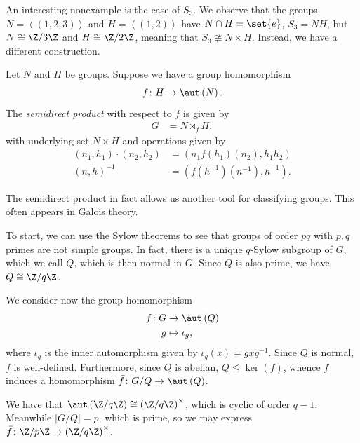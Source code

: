\documentclass[10pt]{mypackage}
\begin{document}
An interesting nonexample is the case of $S_3$. We observe that the groups $N = \left\langle \left( 1,2,3 \right) \right\rangle$ and $H = \left\langle \left( 1,2 \right) \right\rangle$ have $N\cap H = \set{e}$, $S_3 = NH$, but $N\cong \Z/3\Z$ and $H\cong \Z/2\Z$, meaning that $S_3\ncong N\times H$. Instead, we have a different construction.
\begin{definition}
  Let $N$ and $H$ be groups. Suppose we have a group homomorphism
  \begin{align*}
    f\colon H\rightarrow \aut\left( N \right).
  \end{align*}
  The \textit{semidirect product} with respect to $f$ is given by
  \begin{align*}
    G &= N\rtimes_{f} H,
  \end{align*}
  with underlying set $N\times H$ and operations given by
  \begin{align*}
    \left( n_1,h_1 \right)\cdot \left( n_2,h_2 \right) &= \left( n_1f\left( h_1 \right)\left( n_2 \right),h_1h_2 \right)\\
    \left( n,h \right)^{-1} &= \left( f\left( h^{-1} \right)\left( n^{-1} \right),h^{-1} \right).
  \end{align*}
\end{definition}
The semidirect product in fact allows us another tool for classifying groups. This often appears in Galois theory.%

To start, we can use the Sylow theorems to see that groups of order $pq$ with $p,q$ primes are not simple groups. In fact, there is a unique $q$-Sylow subgroup of $G$, which we call $Q$, which is then normal in $G$. Since $Q$ is also prime, we have $Q\cong \Z/q\Z$.%

We consider now the group homomorphism
\begin{align*}
  f\colon G &\rightarrow \aut\left( Q \right)\\
  g&\mapsto \iota_g,
\end{align*}
where $\iota_g$ is the inner automorphism given by $\iota_g(x) = gxg^{-1}$. Since $Q$ is normal, $f$ is well-defined. Furthermore, since $Q$ is abelian, $Q\leq \ker\left( f \right)$, whence $f$ induces a homomorphism $ \bar{f}\colon G/Q\rightarrow \aut\left( Q \right) $.%

We have that $\aut\left( \Z/q\Z \right)\cong \left( \Z/q\Z \right)^{\times}$, which is cyclic of order $q-1$. Meanwhile $\left\vert G/Q \right\vert = p$, which is prime, so we may express $ \bar{f}\colon \Z/p\Z \rightarrow \left( \Z/q\Z \right)^{\times} $.%
\end{document}

